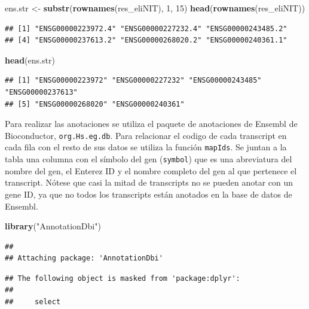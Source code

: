 \documentclass[
]{article}
\newenvironment{Shaded}{\begin{snugshade}}{\end{snugshade}}
\newcommand{\DecValTok}[1]{\textcolor[rgb]{0.00,0.00,0.81}{#1}}
\newcommand{\KeywordTok}[1]{\textcolor[rgb]{0.13,0.29,0.53}{\textbf{#1}}}
\newcommand{\NormalTok}[1]{#1}
\newcommand{\StringTok}[1]{\textcolor[rgb]{0.31,0.60,0.02}{#1}}
\begin{document}
\begin{Shaded}
\begin{Highlighting}[]
\NormalTok{ens.str <-}\StringTok{ }\KeywordTok{substr}\NormalTok{(}\KeywordTok{rownames}\NormalTok{(res_eliNIT), }\DecValTok{1}\NormalTok{, }\DecValTok{15}\NormalTok{)}
\KeywordTok{head}\NormalTok{(}\KeywordTok{rownames}\NormalTok{(res_eliNIT))}
\end{Highlighting}
\end{Shaded}

\begin{verbatim}
## [1] "ENSG00000223972.4" "ENSG00000227232.4" "ENSG00000243485.2"
## [4] "ENSG00000237613.2" "ENSG00000268020.2" "ENSG00000240361.1"
\end{verbatim}

\begin{Shaded}
\begin{Highlighting}[]
\KeywordTok{head}\NormalTok{(ens.str)}
\end{Highlighting}
\end{Shaded}

\begin{verbatim}
## [1] "ENSG00000223972" "ENSG00000227232" "ENSG00000243485" "ENSG00000237613"
## [5] "ENSG00000268020" "ENSG00000240361"
\end{verbatim}

Para realizar las anotaciones se utiliza el paquete de anotaciones de
Ensembl de Bioconductor, \texttt{org.Hs.eg.db}. Para relacionar el
codigo de cada transcript en cada fila con el resto de sus datos se
utiliza la función \texttt{mapIds}. Se juntan a la tabla una columna con
el símbolo del gen (\texttt{symbol}) que es una abreviatura del nombre
del gen, el Enterez ID y el nombre completo del gen al que pertenece el
transcript. Nótese que casi la mitad de transcripts no se pueden anotar
con un gene ID, ya que no todos los transcripts están anotados en la
base de datos de Ensembl.

\begin{Shaded}
\begin{Highlighting}[]
\KeywordTok{library}\NormalTok{(}\StringTok{"AnnotationDbi"}\NormalTok{)}
\end{Highlighting}
\end{Shaded}

\begin{verbatim}
## 
## Attaching package: 'AnnotationDbi'
\end{verbatim}

\begin{verbatim}
## The following object is masked from 'package:dplyr':
## 
##     select
\end{verbatim}
\end{document}
